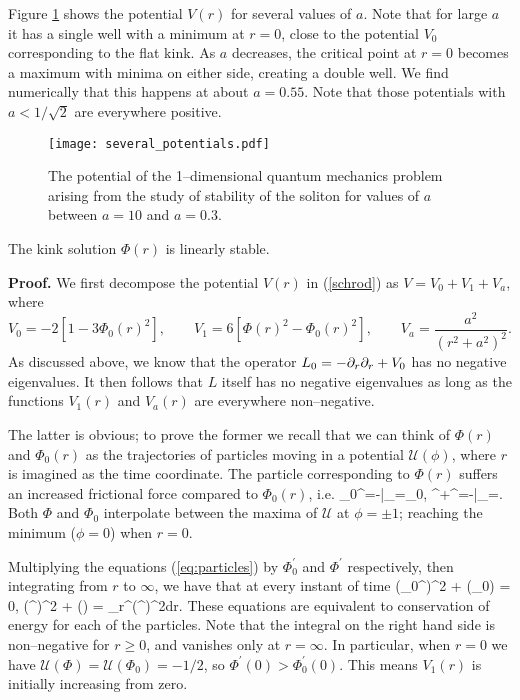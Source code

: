 Figure \ref{fig:several_potentials} shows the potential $V(r)$ for several values of $a$. Note that for large $a$ it has a single well with a minimum at $r=0$, close to the potential $V_0$ corresponding to the flat kink. As $a$ decreases, the critical point at $r=0$ becomes a maximum with minima on either side, creating a double well. We find numerically that this happens at about $a=0.55$. Note that those potentials with $a<1/\sqrt{2}$ are everywhere positive.

\begin{figure}
\texttt{[image: several\_potentials.pdf]}
\caption{\label{fig:several_potentials}The potential of the 1--dimensional quantum mechanics problem arising from the study of stability of the soliton for values of $a$ between $a=10$ and $a=0.3$.}
\end{figure}

\begin{prop}
The kink solution $\Phi(r)$ is linearly stable.
\end{prop} 

{\bf Proof.} We first decompose the potential $V(r)$ in (\ref{schrod}) as $V=V_0+V_1+V_a$, where
\[
V_0 = -2[1-3\Phi_0(r)^2],\qquad 
V_1 = 6[\Phi(r)^2-\Phi_0(r)^2],\qquad V_a = \frac{a^2}{(r^2+a^2)^2}.
\]
As discussed above, we know that the operator $L_0 = -\partial_r\partial_r + V_0$ has no negative eigenvalues. It then follows that $L$ itself has no negative eigenvalues as long as the functions $V_1(r)$ and $V_a(r)$ are everywhere non--negative.

The latter is obvious; to prove the former we recall that we can think of $\Phi(r)$ and $\Phi_0(r)$ as the trajectories of particles moving in a potential $\mathcal{U}(\phi)$, where $r$ is imagined as the time coordinate. The particle corresponding to $\Phi(r)$ suffers an increased frictional force compared to $\Phi_0(r)$, i.e.
\be
\label{eq:particles}
\Phi_0^{\prime\prime}=-\bigg|_{\phi=\Phi_0},\qquad
\Phi^{\prime\prime}+\Phi^\prime=-\bigg|_{\phi=\Phi}.
\ee
Both $\Phi$ and $\Phi_0$ interpolate between the maxima of $\mathcal{U}$ at $\phi=\pm 1$; reaching the minimum ($\phi=0$) when $r=0$.

Multiplying the equations (\ref{eq:particles}) by $\Phi_0^\prime$ and $\Phi^\prime$ respectively, then integrating from $r$ to $\infty$, we have that at every instant of time
\be
\label{eq:energy}
(\Phi_0^\prime)^2 + (\Phi_0) = 0,\qquad
{}(\Phi^\prime)^2 + (\Phi) = \int_r^\infty{}(\Phi^\prime)^2dr.
\ee
These equations are equivalent to conservation of energy for each of the particles. Note that the integral on the right hand side is non--negative for $r\geq 0$, and vanishes only at $r=\infty$. In particular, when $r=0$ we have $\mathcal{U}(\Phi)=\mathcal{U}(\Phi_0)=-1/2$, so $\Phi^\prime(0)>\Phi_0^\prime(0)$. This means $V_1(r)$ is initially increasing from zero.


